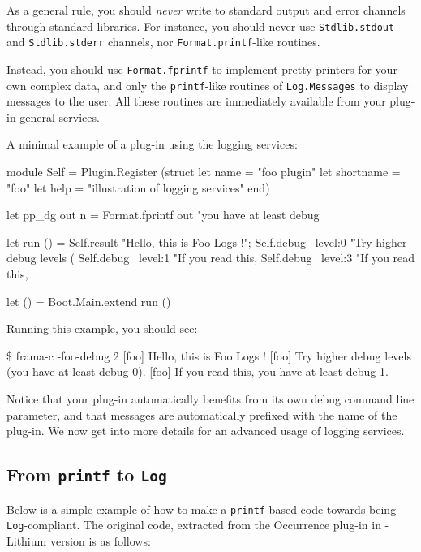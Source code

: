As a general rule, you should \emph{never} write to standard output
and error channels through \ocaml standard libraries. For instance,
you should never use \texttt{Stdlib.stdout} and
\texttt{Stdlib.stderr} channels, nor \texttt{Format.printf}-like
routines.

Instead, you should use \texttt{Format.fprintf} to implement
pretty-printers for your own complex data, and only the
\texttt{printf}-like routines of
\texttt{Log.Messages} to display messages to
the user. All these routines are immediately available from your
plug-in general services.

\begin{example}
A minimal example of a plug-in using the logging services:
\begin{ocamlcode}
module Self = Plugin.Register
  (struct
     let name = "foo plugin"
     let shortname = "foo"
     let help = "illustration of logging services"
   end)

let pp_dg out n =
  Format.fprintf out
    "you have at least debug %

let run () =
  Self.result "Hello, this is Foo Logs !";
  Self.debug ~level:0 "Try higher debug levels (%
  Self.debug ~level:1 "If you read this, %
  Self.debug ~level:3 "If you read this, %

let () = Boot.Main.extend run ()
\end{ocamlcode}
\end{example}

Running this example, you should see:
\begin{shell}
\$ frama-c -foo-debug 2
[foo] Hello, this is Foo Logs !
[foo] Try higher debug levels (you have at least debug 0).
[foo] If you read this, you have at least debug 1.
\end{shell}

Notice that your plug-in automatically benefits from its own debug
command line parameter, and that messages are automatically prefixed
with the name of the plug-in. We now get into more details for an
advanced usage of logging services.

\subsection{From \texttt{printf} to \texttt{Log}}

Below is a simple example of how to make a \texttt{printf}-based code
towards being \texttt{Log}-compliant. The original code, extracted
from the \textsf{Occurrence} plug-in in \framac-\textsf{Lithium}
version is as follows:

